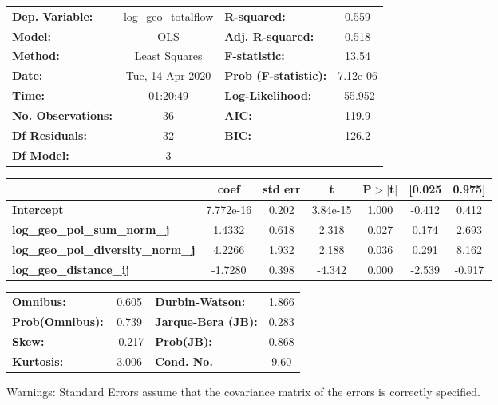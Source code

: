 \begin{center}
\begin{tabular}{lclc}
\toprule
\textbf{Dep. Variable:}                    & log\_geo\_totalflow & \textbf{  R-squared:         } &     0.559   \\
\textbf{Model:}                            &         OLS         & \textbf{  Adj. R-squared:    } &     0.518   \\
\textbf{Method:}                           &    Least Squares    & \textbf{  F-statistic:       } &     13.54   \\
\textbf{Date:}                             &   Tue, 14 Apr 2020  & \textbf{  Prob (F-statistic):} &  7.12e-06   \\
\textbf{Time:}                             &       01:20:49      & \textbf{  Log-Likelihood:    } &   -55.952   \\
\textbf{No. Observations:}                 &            36       & \textbf{  AIC:               } &     119.9   \\
\textbf{Df Residuals:}                     &            32       & \textbf{  BIC:               } &     126.2   \\
\textbf{Df Model:}                         &             3       & \textbf{                     } &             \\
\bottomrule
\end{tabular}
\begin{tabular}{lcccccc}
                                           & \textbf{coef} & \textbf{std err} & \textbf{t} & \textbf{P$> |$t$|$} & \textbf{[0.025} & \textbf{0.975]}  \\
\midrule
\textbf{Intercept}                         &    7.772e-16  &        0.202     &  3.84e-15  &         1.000        &       -0.412    &        0.412     \\
\textbf{log\_geo\_poi\_sum\_norm\_j}       &       1.4332  &        0.618     &     2.318  &         0.027        &        0.174    &        2.693     \\
\textbf{log\_geo\_poi\_diversity\_norm\_j} &       4.2266  &        1.932     &     2.188  &         0.036        &        0.291    &        8.162     \\
\textbf{log\_geo\_distance\_ij}            &      -1.7280  &        0.398     &    -4.342  &         0.000        &       -2.539    &       -0.917     \\
\bottomrule
\end{tabular}
\begin{tabular}{lclc}
\textbf{Omnibus:}       &  0.605 & \textbf{  Durbin-Watson:     } &    1.866  \\
\textbf{Prob(Omnibus):} &  0.739 & \textbf{  Jarque-Bera (JB):  } &    0.283  \\
\textbf{Skew:}          & -0.217 & \textbf{  Prob(JB):          } &    0.868  \\
\textbf{Kurtosis:}      &  3.006 & \textbf{  Cond. No.          } &     9.60  \\
\bottomrule
\end{tabular}
\end{center}

Warnings: \newline
 [1] Standard Errors assume that the covariance matrix of the errors is correctly specified.